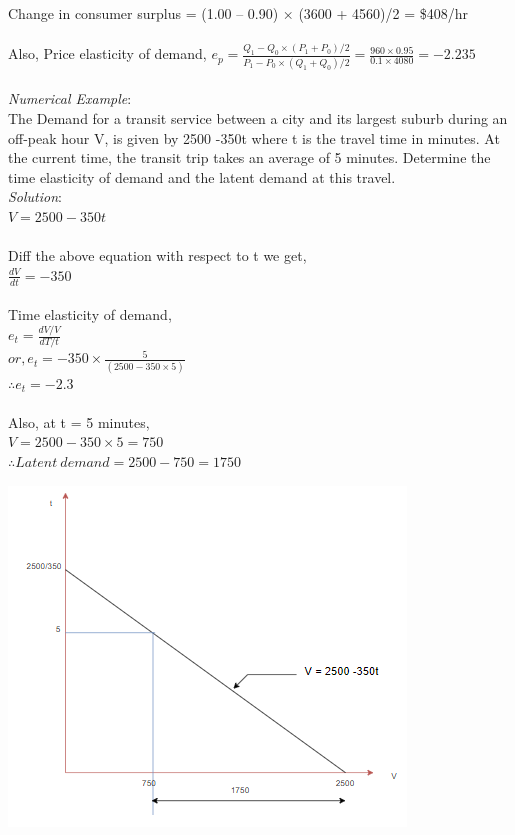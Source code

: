 Change in consumer surplus = (1.00 – 0.90) × (3600 + 4560)/2 = \$408/hr\\\\
Also, Price elasticity of demand,
$ e_p = \frac{Q_1 - Q_0 \times (P_1 + P_0)/2}{P_1 - P_0 \times (Q_1 + Q_0)/2} = \frac{960 \times 0.95}{0.1 \times 4080} = -2.235$\\\\
\textit{Numerical Example}:\\
The Demand for a transit service between a city and its largest suburb during an off-peak hour V, is given by 2500 -350t where t is the travel time in minutes. At the current time, the transit trip takes an average of 5 minutes. Determine the time elasticity of demand and the latent demand at this travel.\\
\textit{Solution}:\\
$V = 2500 - 350t$\\\\
Diff the above equation with respect to t we get,\\
$ \frac{dV}{dt} = -350$\\\\
Time elasticity of demand,\\
$e_t = \frac{dV/V}{dT/t}$\\
$or, e_t = -350 \times \frac{5}{(2500 - 350 \times 5)}$\\
$ \therefore e_t = -2.3$\\\\
Also, at t = 5 minutes,\\
$ V = 2500 - 350 \times 5  = 750$\\
$\therefore Latent \: demand = 2500 -750 = 1750$
\begin{center}
	\includegraphics[scale=0.7]{gfx/fig52.png}
\end{center}
%
